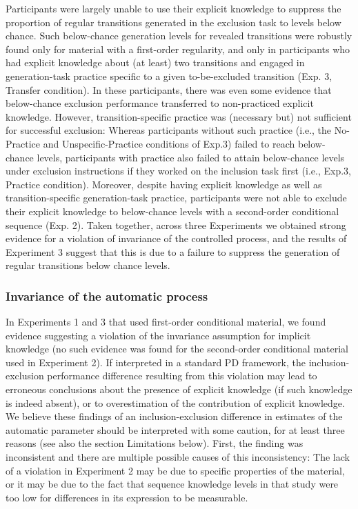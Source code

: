 \documentclass[floatsintext,man]{apa6}
\begin{document}
Participants were largely unable to use their explicit knowledge to
suppress the proportion of regular transitions generated in the
exclusion task to levels below chance. Such below-chance generation
levels for revealed transitions were robustly found only for material
with a first-order regularity, and only in participants who had explicit
knowledge about (at least) two transitions and engaged in
generation-task practice specific to a given to-be-excluded transition
(Exp. 3, Transfer condition). In these participants, there was even some
evidence that below-chance exclusion performance transferred to
non-practiced explicit knowledge. However, transition-specific practice
was (necessary but) not sufficient for successful exclusion: Whereas
participants without such practice (i.e., the No-Practice and
Unspecific-Practice conditions of Exp.3) failed to reach below-chance
levels, participants with practice also failed to attain below-chance
levels under exclusion instructions if they worked on the inclusion task
first (i.e., Exp.3, Practice condition). Moreover, despite having
explicit knowledge as well as transition-specific generation-task
practice, participants were not able to exclude their explicit knowledge
to below-chance levels with a second-order conditional sequence (Exp.
2). Taken together, across three Experiments we obtained strong evidence
for a violation of invariance of the controlled process, and the results
of Experiment 3 suggest that this is due to a failure to suppress the
generation of regular transitions below chance levels.

\subsubsection{Invariance of the automatic
process}\label{invariance-of-the-automatic-process}

In Experiments 1 and 3 that used first-order conditional material, we
found evidence suggesting a violation of the invariance assumption for
implicit knowledge (no such evidence was found for the second-order
conditional material used in Experiment 2). If interpreted in a standard
PD framework, the inclusion-exclusion performance difference resulting
from this violation may lead to erroneous conclusions about the presence
of explicit knowledge (if such knowledge is indeed absent), or to
overestimation of the contribution of explicit knowledge. We believe
these findings of an inclusion-exclusion difference in estimates of the
automatic parameter should be interpreted with some caution, for at
least three reasons (see also the section Limitations below). First, the
finding was inconsistent and there are multiple possible causes of this
inconsistency: The lack of a violation in Experiment 2 may be due to
specific properties of the material, or it may be due to the fact that
sequence knowledge levels in that study were too low for differences in
its expression to be measurable.
\end{document}
